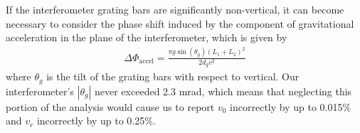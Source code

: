 \documentclass[twocolumn,prl,showpacs,superscriptaddress]{revtex4-1}   %
\newcommand{\Omegalab}{\Omega_{\mathrm{lab},y}}
\newcommand{\dphisepj}{\Delta\Phi_{\mathrm{sep},j}}
\newcommand{\dphisag}{\Delta\Phi_{\mathrm{sag}}}
\newcommand{\dphiaccel}{\Delta\Phi_{\mathrm{accel}}}
\newcommand{\cenv}{C_{\mathrm{env}}}
\begin{document}
If the interferometer grating bars are significantly non-vertical, it can become necessary to consider the phase shift induced by the component of gravitational acceleration in the plane of the interferometer, which is given by
\begin{align}
	\dphiaccel = \frac{\pi g\sin({\theta_g})(L_1+L_2)^2}{2d_g v^2}
	\label{phiAccel}
\end{align}
where $\theta_g$ is the tilt of the grating bars with respect to vertical. 
Our interferometer's $|\theta_g|$ never exceeded 2.3 mrad, which means that neglecting this portion of the analysis would cause us to report $v_0$ incorrectly by up to 0.015\% and $v_r$ incorrectly by up to 0.25\%.

\end{document}
